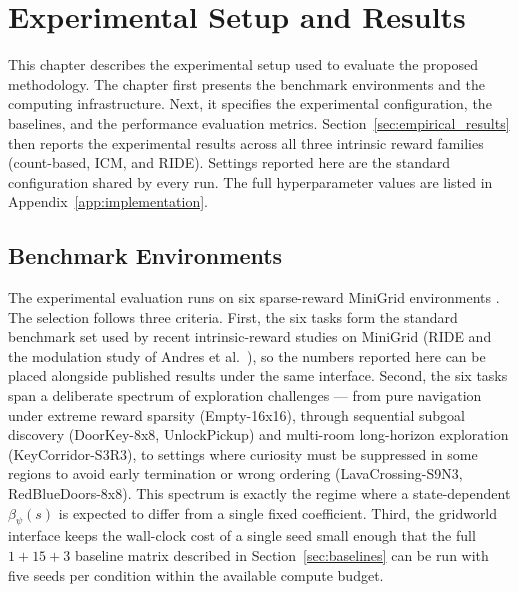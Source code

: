 \chapter{Experimental Setup and Results}
\label{chap:experiment}

This chapter describes the experimental setup used to evaluate the proposed methodology. The chapter first presents the benchmark environments and the computing infrastructure. Next, it specifies the experimental configuration, the baselines, and the performance evaluation metrics. Section~\ref{sec:empirical_results} then reports the experimental results across all three intrinsic reward families (count-based, ICM, and RIDE). Settings reported here are the standard configuration shared by every run. The full hyperparameter values are listed in Appendix~\ref{app:implementation}.

\section{Benchmark Environments}
\label{sec:benchmark_environments}

The experimental evaluation runs on six sparse-reward MiniGrid environments \cite{chevalier2018minigrid}. The selection follows three criteria. First, the six tasks form the standard benchmark set used by recent intrinsic-reward studies on MiniGrid (RIDE \cite{raileanu2020ride} and the modulation study of Andres et al.\ \cite{andres2025impact}), so the numbers reported here can be placed alongside published results under the same interface. Second, the six tasks span a deliberate spectrum of exploration challenges --- from pure navigation under extreme reward sparsity (Empty-16x16), through sequential subgoal discovery (DoorKey-8x8, UnlockPickup) and multi-room long-horizon exploration (KeyCorridor-S3R3), to settings where curiosity must be suppressed in some regions to avoid early termination or wrong ordering (LavaCrossing-S9N3, RedBlueDoors-8x8). This spectrum is exactly the regime where a state-dependent $\beta_\psi(s)$ is expected to differ from a single fixed coefficient. Third, the gridworld interface keeps the wall-clock cost of a single seed small enough that the full $1 + 15 + 3$ baseline matrix described in Section~\ref{sec:baselines} can be run with five seeds per condition within the available compute budget.


